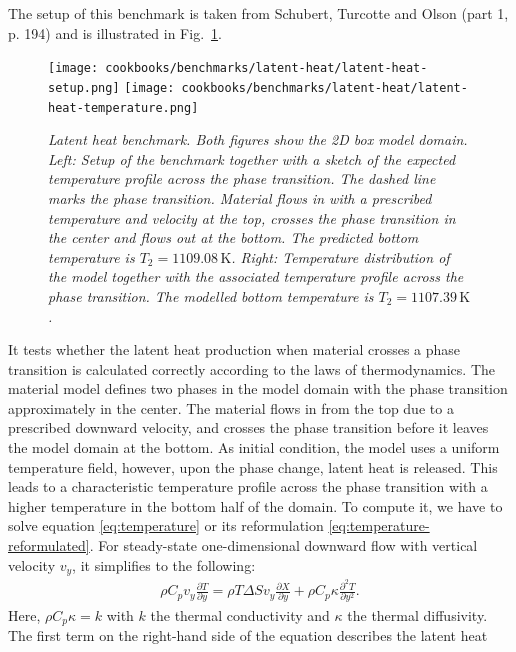 \documentclass{article}
\begin{document}
The setup of this benchmark is taken from Schubert, Turcotte and Olson \cite{STO01} (part 1, p. 194) and is illustrated in Fig.~\ref{fig:latent-heat-benchmark}.
\begin{figure}
  \begin{center}
    \texttt{[image: cookbooks/benchmarks/latent-heat/latent-heat-setup.png]}
    \hfill
    \texttt{[image: cookbooks/benchmarks/latent-heat/latent-heat-temperature.png]}
  \end{center}
  \caption{\it Latent heat benchmark. Both figures show the 2D box model domain.
      Left: Setup of the benchmark together with a sketch of the expected
      temperature profile across the phase transition. The dashed line marks
      the phase transition. Material flows in with a prescribed temperature and
      velocity at the top, crosses the phase transition in the center and flows
      out at the bottom. The predicted bottom temperature is $T_2 = 1109.08 \, \text{K}$.
      Right: Temperature distribution of the model together with the associated
      temperature profile across the phase transition. The modelled bottom
      temperature is $T_2 = 1107.39 \, \text{K}$.}
  \label{fig:latent-heat-benchmark}
\end{figure}
It tests whether the latent heat production when material crosses a phase
transition is calculated correctly according to the laws of thermodynamics. The material
model defines two phases in the model domain with the phase transition
approximately in the center. The material flows in from the top due to a
prescribed downward velocity, and crosses the phase transition before it leaves
the model domain at the bottom. As initial condition, the model uses a uniform
temperature field, however, upon the phase change, latent heat is released. This
leads to a characteristic temperature profile across the phase transition with a
higher temperature in the bottom half of the domain. To compute it, we have to solve 
equation \eqref{eq:temperature} or its reformulation
\eqref{eq:temperature-reformulated}. For
steady-state one-dimensional downward flow with vertical velocity $v_y$, it
simplifies to the following:
\begin{gather*}
\rho C_p
v_y
\frac{\partial T}{\partial y} = 
\rho T \Delta S v_y \frac{\partial X}{\partial y} 
+ \rho C_p \kappa
\frac{\partial^2 T}{\partial y^2}.
\end{gather*}
Here, $\rho C_p \kappa = k$ with $k$ the thermal conductivity and $\kappa$ the
thermal diffusivity.
The first term on the right-hand side of the equation describes the latent heat
\end{document}
